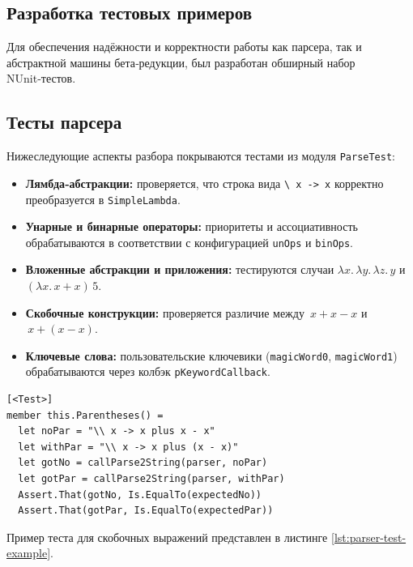 \begin{itemize}
\section{Разработка тестовых примеров}
\label{sec:test-examples}

Для обеспечения надёжности и корректности работы как парсера, так и абстрактной машины бета‑редукции, был разработан обширный набор NUnit‑тестов.

\subsection{Тесты парсера}

Нижеследующие аспекты разбора покрываются тестами из модуля \texttt{ParseTest}:

\begin{itemize}
  \item \textbf{Лямбда‑абстракции:} проверяется, что строка вида \verb|\ x -> x| корректно преобразуется в \texttt{SimpleLambda}.  
  \item \textbf{Унарные и бинарные операторы:} приоритеты и ассоциативность обрабатываются в соответствии с конфигурацией \texttt{unOps} и \texttt{binOps}.  
  \\
  \item \textbf{Вложенные абстракции и приложения:} тестируются случаи \(\lambda x.\,\lambda y.\,\lambda z.\,y\) и \((\lambda x.\,x+x)\,5\).  
  \item \textbf{Скобочные конструкции:} проверяется различие между \(\,x + x - x\) и \(\,x + (x - x)\).  
  \item \textbf{Ключевые слова:} пользовательские ключевики (\texttt{magicWord0}, \texttt{magicWord1}) обрабатываются через колбэк \texttt{pKeywordCallback}.  
\end{itemize}

\begin{lstlisting}[float=tb,frame=lines,label=lst:parser-test-example,caption={Пример теста для скобочных выражений}]
[<Test>]
member this.Parentheses() =
  let noPar = "\\ x -> x plus x - x"
  let withPar = "\\ x -> x plus (x - x)"
  let gotNo = callParse2String(parser, noPar)
  let gotPar = callParse2String(parser, withPar)
  Assert.That(gotNo, Is.EqualTo(expectedNo))
  Assert.That(gotPar, Is.EqualTo(expectedPar))
\end{lstlisting}

Пример теста для скобочных выражений представлен в листинге \ref{lst:parser-test-example}.


\end{itemize}
